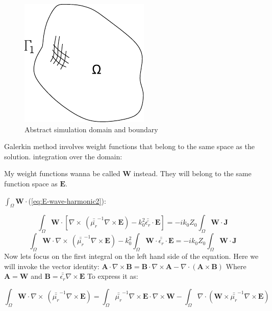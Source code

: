 \begin{figure}[h]
\centering
\includegraphics[scale=0.5]{./img/dominio.pdf}
\caption{Abstract simulation domain and boundary}
\label{fig:domain}
\end{figure}


Galerkin method involves weight functions that
belong to the same space as the solution.
integration over the domain:

My weight functions wanna be called $\mathbf{W}$ instead. They will belong to the same function space as $\mathbf{E}$.

$\int_{\Omega} \mathbf{W} \cdot$(\ref{eq:E-wave-harmonic2}):

\begin{equation}
\int_{\Omega}\mathbf{W}\cdot\left[ \nabla\times\ \left(\bar{\bar{\mu_r}}^{-1}\nabla\times \mathbf{E} \right) - k_0^{2}\bar{\bar{\epsilon_r}}\cdot \mathbf{E}\right]= - ik_0Z_0 \int_{\Omega} \mathbf{W}\cdot\mathbf{J} \label{eq:E-wave-harmonic3} 
\end{equation}
\begin{equation}
\int_{\Omega}\mathbf{W}\cdot \nabla\times\ \left(\bar{\bar{\mu_r}}^{-1}\nabla\times \mathbf{E} \right) -k_0^{2}\int_{\Omega}\mathbf{W}\cdot \bar{\bar{\epsilon_r}}\cdot \mathbf{E}= - ik_0Z_0 \int_{\Omega} \mathbf{W}\cdot\mathbf{J} \label{eq:E-wave-harmonic3} 
\end{equation}
Now lets focus on the first integral on the left hand side of the equation. Here we will invoke the vector identity: $\mathbf{A}\cdot\nabla\times\mathbf{B} = \mathbf{B}\cdot\nabla\times\mathbf{A} - \nabla\cdot(\mathbf{A}\times\mathbf{B})$ 
Where $\mathbf{A}=\mathbf{W}$ and $\mathbf{B}=\bar{\bar{\epsilon_r}}\nabla\times \mathbf{E}$ To express it as:

\begin{equation}
\int_{\Omega}\mathbf{W}\cdot \nabla\times\ \left(\bar{\bar{\mu_r}}^{-1}\nabla\times \mathbf{E} \right) = \int_{\Omega} \bar{\bar{\mu_r}}^{-1}\nabla\times \mathbf{E}\cdot \nabla\times\mathbf{W}-\int_{\Omega}\nabla\cdot
\left(\mathbf{W}\times\bar{\bar{\mu_r}}^{-1}\nabla\times\mathbf{E}
\right) 
\end{equation}

